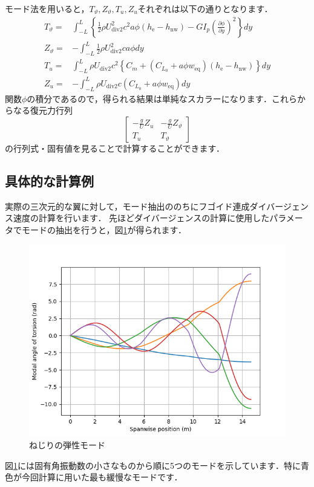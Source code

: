 \documentclass{jarticle}
\begin{document}
モード法を用いると，$T_\vartheta,Z_\vartheta,T_u,Z_u$それぞれは以下の通りとなります．
\begin{align}
    T_\vartheta =& \int_{-L}^{L} \left\{ \frac{1}{2}\rho U_\mathrm{div2}^2 c^2 a \phi  (h_\mathrm{e}-h_\mathrm{nw}) - GI_p\left( \frac{\partial \phi}{\partial y} \right)^2 \right\} dy \\
    Z_\vartheta =& -\int_{-L}^L \frac{1}{2}\rho U_\mathrm{div2}^2 c a \phi dy \\
    T_u =& \int_{-L}^L \rho U_\mathrm{div2} c^2 \left\{ C_m +  (C_{L_0} + a\phi w_\mathrm{eq})  (h_\mathrm{e}-h_\mathrm{nw}) \right\} dy \\
    Z_u =& -\int_{-L}^L \rho U_\mathrm{div2} c (C_{L_0} + a\phi w_\mathrm{eq}) dy
\end{align}
関数$\phi$の積分であるので，得られる結果は単純なスカラーになります．これらからなる復元力行列
\begin{equation}
    \begin{bmatrix}
        -\frac{g}{U}Z_u & -\frac{g}{U}Z_\vartheta \\
        T_u & T_\vartheta
    \end{bmatrix}
\end{equation}
の行列式・固有値を見ることで計算することができます．

\subsection{具体的な計算例}

実際の三次元的な翼に対して，モード抽出ののちにフゴイド連成ダイバージェンス速度の計算を行います．
先ほどダイバージェンスの計算に使用したパラメータでモードの抽出を行うと，図\ref{mode}が得られます．
\begin{figure}[H]
    \centering
    \includegraphics[width=0.7\linewidth]{image/theta_mode.png}
    \caption{ねじりの弾性モード}
    \label{mode}
\end{figure}
図\ref{mode}には固有角振動数の小さなものから順に5つのモードを示しています．特に青色が今回計算に用いた最も緩慢なモードです．
\end{document}
